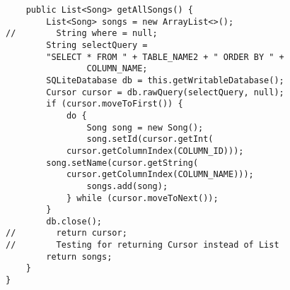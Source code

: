 \documentclass[12pt]{article}
\begin{document}
\begin{lstlisting}
    public List<Song> getAllSongs() {
        List<Song> songs = new ArrayList<>();
//        String where = null;
        String selectQuery = 
	    "SELECT * FROM " + TABLE_NAME2 + " ORDER BY " +
                COLUMN_NAME;
        SQLiteDatabase db = this.getWritableDatabase();
        Cursor cursor = db.rawQuery(selectQuery, null);
        if (cursor.moveToFirst()) {
            do {
                Song song = new Song();
                song.setId(cursor.getInt(
		    cursor.getColumnIndex(COLUMN_ID)));
		song.setName(cursor.getString(
		    cursor.getColumnIndex(COLUMN_NAME)));
                songs.add(song);
            } while (cursor.moveToNext());
        }
        db.close();
//        return cursor;
//        Testing for returning Cursor instead of List
        return songs;
    }
}
	\end{lstlisting}
\end{document}
